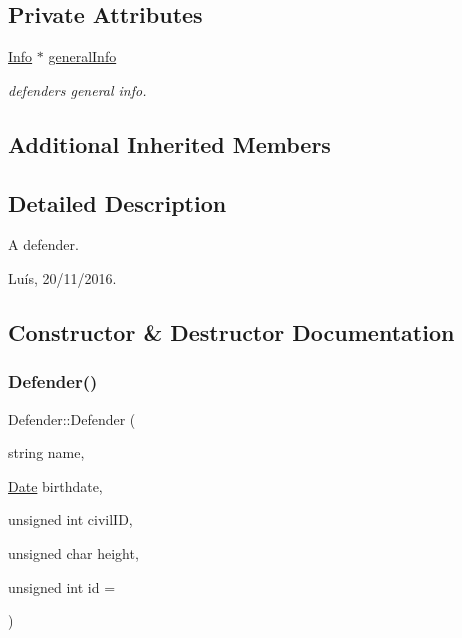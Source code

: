 \subsection*{Private Attributes}
\begin{DoxyCompactItemize}
\item 
\hyperlink{class_info}{Info} $\ast$ \hyperlink{class_defender_a849c8836a0dff2abd8df7a8d6434cc8c}{general\+Info}
\begin{DoxyCompactList}\small\item\em defender\textquotesingle{}s general info. \end{DoxyCompactList}\end{DoxyCompactItemize}
\subsection*{Additional Inherited Members}


\subsection{Detailed Description}
A defender. 

Luís, 20/11/2016. 

\subsection{Constructor \& Destructor Documentation}
\hypertarget{class_defender_aa09b1f02e3314aef1463528b3a0c70e2}{}\label{class_defender_aa09b1f02e3314aef1463528b3a0c70e2} 
\subsubsection{\texorpdfstring{Defender()}{Defender()}\hspace{0.1cm}{\footnotesize\ttfamily [1/2]}}
{\footnotesize\ttfamily Defender\+::\+Defender (\begin{DoxyParamCaption}\item[{string}]{name,  }\item[{\hyperlink{class_date}{Date}}]{birthdate,  }\item[{unsigned int}]{civil\+ID,  }\item[{unsigned char}]{height,  }\item[{unsigned int}]{id = {} }\end{DoxyParamCaption})}



